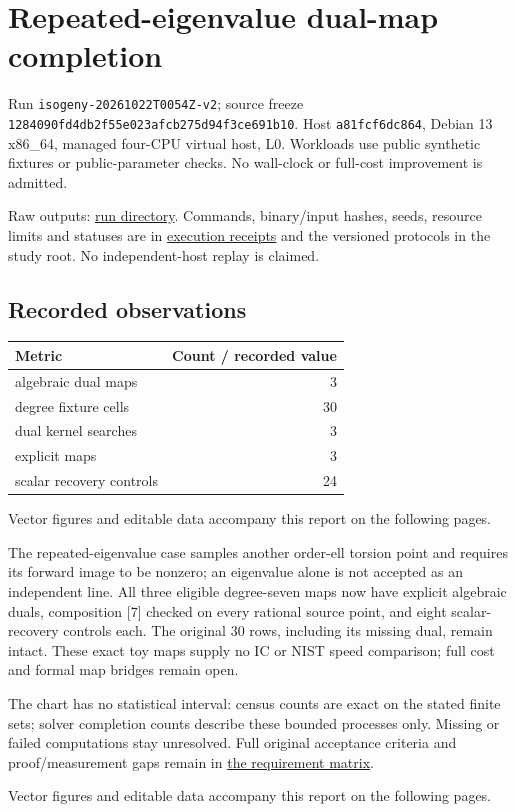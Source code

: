 \documentclass[
  10pt,
  letterpaper,
  landscape]{article}
\author{}
\date{}
\begin{document}
\section{Repeated-eigenvalue dual-map
completion}\label{repeated-eigenvalue-dual-map-completion}

Run \texttt{isogeny-20261022T0054Z-v2}; source freeze
\texttt{1284090fd4db2f55e023afcb275d94f3ce691b10}. Host
\texttt{a81fcf6dc864}, Debian 13 x86\_64, managed four-CPU virtual host,
L0. Workloads use public synthetic fixtures or public-parameter checks.
No wall-clock or full-cost improvement is admitted.

Raw outputs:
\href{../../../execution-v1/runs/isogeny-20261022T0054Z-v2/}{run
directory}. Commands, binary/input hashes, seeds, resource limits and
statuses are in \href{../../../execution-v1/}{execution receipts} and
the versioned protocols in the study root. No independent-host replay is
claimed.

\subsection{Recorded observations}\label{recorded-observations}

\begin{longtable}[]{@{}lr@{}}
\toprule\noalign{}
Metric & Count / recorded value \\
\midrule\noalign{}
\endhead
\bottomrule\noalign{}
\endlastfoot
algebraic dual maps & 3 \\
degree fixture cells & 30 \\
dual kernel searches & 3 \\
explicit maps & 3 \\
scalar recovery controls & 24 \\
\end{longtable}

Vector figures and editable data accompany this report on the following pages.

The repeated-eigenvalue case samples another order-ell torsion point and
requires its forward image to be nonzero; an eigenvalue alone is not
accepted as an independent line. All three eligible degree-seven maps
now have explicit algebraic duals, composition {[}7{]} checked on every
rational source point, and eight scalar-recovery controls each. The
original 30 rows, including its missing dual, remain intact. These exact
toy maps supply no IC or NIST speed comparison; full cost and formal map
bridges remain open.

The chart has no statistical interval: census counts are exact on the
stated finite sets; solver completion counts describe these bounded
processes only. Missing or failed computations stay unresolved. Full
original acceptance criteria and proof/measurement gaps remain in
\href{../../../EXPERIMENTS.md}{the requirement matrix}.

Vector figures and editable data accompany this report on the following pages.
\end{document}
